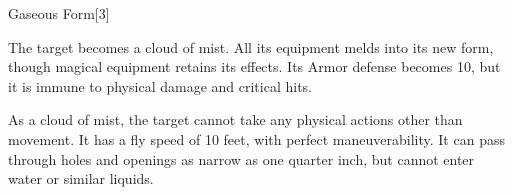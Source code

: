 \begin{spellsection}{Gaseous Form}[3]
    \begin{spellheader}
    \end{spellheader}
    \begin{spellcontent}
        \begin{spelltargetinginfo}
        \end{spelltargetinginfo}
        \begin{spelleffects}
            \spelleffect The target becomes a cloud of mist. All its equipment melds into its new form, though magical equipment retains its effects. Its Armor defense becomes 10, but it is immune to physical damage and critical hits.

            As a cloud of mist, the target cannot take any physical actions other than movement. It has a fly speed of 10 feet, with perfect maneuverability. It can pass through holes and openings as narrow as one quarter inch, but cannot enter water or similar liquids.
            \spelldur \durshort \dismissable
        \end{spelleffects}
    \end{spellcontent}
    \begin{spellfooter}
        \miscastexplode
    \end{spellfooter}
    \begin{spellaugments}
    \end{spellaugments}
\end{spellsection}

